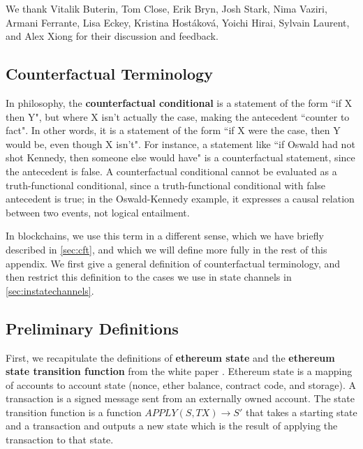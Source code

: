 \documentclass[prb,floatfix,reprint,nofootinbib,amsmath,amssymb,epsfig,pre,floats,letterpaper,groupedaffiliation,tightenlines,allcolors=blue,11pt]{revtex4}
\theoremstyle{definition}
\theoremstyle{definition}
\theoremstyle{definition}
\begin{document}
\begin{acknowledgments}\label{section:acknowledgements}
We thank Vitalik Buterin, Tom Close, Erik Bryn, Josh Stark, Nima Vaziri, Armani Ferrante, Lisa Eckey, Kristina Host\'akov\'a, Yoichi Hirai, Sylvain Laurent, and Alex Xiong for their discussion and feedback.
\end{acknowledgments}

\nocite{*}



\begin{appendix}

\cleardoublepage

\section{Counterfactual Terminology}
\label{appendix:sec:cft}

In philosophy, the \textbf{counterfactual conditional} \cite{wiki:CounterfactualConditional_2017} is a statement of the form ``if X then Y", but where X isn't actually the case, making the antecedent ``counter to fact". In other words, it is a statement of the form ``if X were the case, then Y would be, even though X isn't". For instance, a statement like ``if Oswald had not shot Kennedy, then someone else would have" is a counterfactual statement, since the antecedent is false. A counterfactual conditional cannot be evaluated as a truth-functional conditional, since a truth-functional conditional with false antecedent is true\cite{essrm:Counterfactual}; in the Oswald-Kennedy example, it expresses a causal relation between two events, not logical entailment.

In blockchains, we use this term in a different sense, which we have briefly described in \ref{sec:cft}, and which we will define more fully in the rest of this appendix. We first give a general definition of counterfactual terminology, and then restrict this definition to the cases we use in state channels in \ref{sec:instatechannels}.

\subsection{Preliminary Definitions}

First, we recapitulate the definitions of \textbf{ethereum state} and the \textbf{ethereum state transition function} from the white paper \cite{Buterin_2013}. Ethereum state is a mapping of accounts to account state (nonce, ether balance, contract code, and storage). A transaction is a signed message sent from an externally owned account. The state transition function is a function $APPLY(S, TX) \to S'$ that takes a starting state and a transaction and outputs a new state which is the result of applying the transaction to that state.


\end{appendix}
\end{document}
